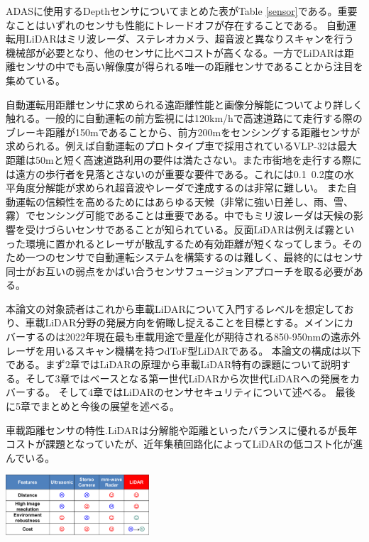 \documentclass[twocolumn, 11pt, a4j]{article}
\begin{document}
ADASに使用するDepthセンサについてまとめた表がTable \ref{sensor}である。重要なことはいずれのセンサも性能にトレードオフが存在することである。
自動運転用LiDARはミリ波レーダ、ステレオカメラ、超音波と異なりスキャンを行う機械部が必要となり、他のセンサに比べコストが高くなる。一方でLiDARは距離センサの中でも高い解像度が得られる唯一の距離センサであることから注目を集めている。

自動運転用距離センサに求められる遠距離性能と画像分解能についてより詳しく触れる。一般的に自動運転の前方監視には120km/hで高速道路にて走行する際のブレーキ距離が150mであることから、前方200mをセンシングする距離センサが求められる。例えば自動運転のプロトタイプ車で採用されているVLP-32\cite{velodyne, velopatent}は最大距離は50mと短く高速道路利用の要件は満たさない。また市街地を走行する際には遠方の歩行者を見落とさないのが重要な要件である。これには0.1~0.2度の水平角度分解能が求められ超音波やレーダ\cite{mitomo201077}で達成するのは非常に難しい。
また自動運転の信頼性を高めるためにはあらゆる天候（非常に強い日差し、雨、雪、霧）でセンシング可能であることは重要である。中でもミリ波レーダは天候の影響を受けづらいセンサであることが知られている。反面LiDARは例えば霧といった環境に置かれるとレーザが散乱するため有効距離が短くなってしまう。そのため一つのセンサで自動運転システムを構築するのは難しく、最終的にはセンサ同士がお互いの弱点をかばい合うセンサフュージョンアプローチを取る必要がある。

本論文の対象読者はこれから車載LiDARについて入門するレベルを想定しており、車載LiDAR分野の発展方向を俯瞰し捉えることを目標とする。メインにカバーするのは2022年現在最も車載用途で量産化が期待される850-950nmの遠赤外レーザを用いるスキャン機構を持つdToF型LiDARである\cite{niclass2012100, yoshioka201820, kondo2020automotive, ta20202d, kumagai2021189x600}。
本論文の構成は以下である。まず2章ではLiDARの原理から車載LiDAR特有の課題について説明する。そして3章ではベースとなる第一世代LiDARから次世代LiDARへの発展をカバーする。
そして4章ではLiDARのセンサセキュリティについて述べる。
最後に5章でまとめと今後の展望を述べる。

\begin{table}[!t]
\centering
\caption{車載距離センサの特性.LiDARは分解能や距離といったバランスに優れるが長年コストが課題となっていたが、近年集積回路化によってLiDARの低コスト化が進んでいる。}
 \includegraphics[width=0.4\textwidth]{figs/distancesensor.png}
\label{sensor}
\end{table}
\end{document}
